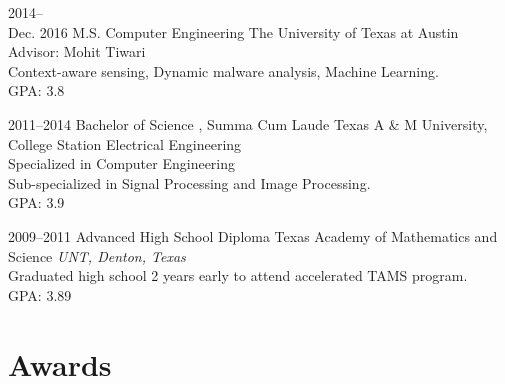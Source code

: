 \documentclass[]{friggeri-cv} %
\begin{document}
\begin{entrylist}


\entry
{2014-- \\ Dec. 2016}
{M.S. {\normalfont Computer Engineering}}
{The University of Texas at Austin}
{Advisor: Mohit Tiwari \\ Context-aware sensing, Dynamic malware analysis, Machine Learning. \\ GPA: 3.8}


\entry
{2011--2014}
{Bachelor of Science {\normalfont, Summa Cum Laude}}
{Texas A \& M University, College Station}
{Electrical Engineering \\ Specialized in Computer Engineering \\ Sub-specialized in Signal Processing and Image Processing. \\ GPA: 3.9}


\entry
{2009--2011}
{Advanced High School Diploma}
{Texas Academy of Mathematics and Science}
{\emph{UNT, Denton, Texas}
 \\ Graduated high school 2 years early to attend accelerated TAMS program. \\ GPA: 3.89}

\end{entrylist}


\section{Awards}
\end{document}
